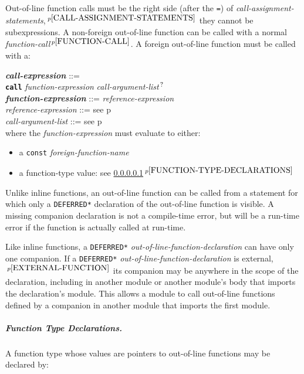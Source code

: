 \documentclass[12pt]{article}
\newcommand{\subsubsubsubsection}[1]{\subparagraph[#1]{#1.}}
\newcommand{\QMARK}{{$^{\,\mbox{\footnotesize ?}}$}}
\newcommand{\ttkey}[1]{{\tt \bfseries #1}}
\newcommand{\emkey}[1]{{\em \bfseries #1}}
\newcommand{\itemref}[1]{\ref{#1}$\,^{p\pageref{#1}}$}
\newcommand{\pagref}[1]{p\pageref{#1}}
\newcommand{\pagnote}[1]{$\,^{p\pageref{#1}}$}
\newenvironment{indpar}[1][0.3in]%
	{\begin{list}{}%
		     {\setlength{\itemsep}{0in}%
		      \setlength{\topsep}{0in}%
		      \setlength{\parsep}{1ex}%
		      \setlength{\labelwidth}{#1}%
		      \setlength{\leftmargin}{#1}%
		      \addtolength{\leftmargin}{\labelsep}}%
	 \item}%
	{\end{list}}
\begin{document}
Out-of-line function calls must be the right side (after the {\tt =})
of {\em call-assignment-state\-ments},\pagnote{CALL-ASSIGNMENT-STATEMENTS}
they cannot be subexpressions.
A non-foreign out-of-line function can be called with a normal
{\em function-call}\pagnote{FUNCTION-CALL}. A foreign
out-of-line function must be called with a:
\begin{indpar}
\emkey{call-expression}\label{CALL-EXPRESSION} ::= \\
\hspace*{0.25in}
	\ttkey{call} {\em function-expression}
	     {\em call-argument-list}\QMARK{}
\\[0.5ex]
\emkey{function-expression} ::= {\em reference-expression}
\\[0.5ex]
{\em reference-expression} ::= see \pagref{REFERENCE-EXPRESSION}
\\[0.5ex]
{\em call-argument-list} ::= see \pagref{CALL-ARGUMENT-LIST}
\\[2ex]
where the {\em function-expression} must evaluate to either:
\begin{itemize}
\item a {\tt const} {\em foreign-function-name}
\item a function-type value: see \itemref{FUNCTION-TYPE-DECLARATIONS}
\end{itemize}
\end{indpar}

Unlike inline functions, an out-of-line function can
be called from a statement for which only a {\tt *DEFERRED*} declaration
of the out-of-line function is visible.  A missing companion
declaration is not a compile-time error, but will be a
run-time error if the function is actually called at run-time.

Like inline functions, a {\tt *DEFERRED*} {\em out-of-line-function-declaration}
can have only one companion.
If\label{OUT-OF-LINE-EXTERNAL-COMPANION}
a {\tt *DEFERRED*} {\em out-of-line-function-declaration}
is external,\pagnote{EXTERNAL-FUNCTION}
its companion may be anywhere in the scope of the declaration,
including in another module or another module's body that imports
the declaration's module.
This allows a module to call out-of-line functions defined by
a companion in another module that imports the first module.

\subsubsubsubsection{Function Type Declarations}
\label{FUNCTION-TYPE-DECLARATIONS}

A function type whose values are pointers to out-of-line
functions may be declared by:
\end{document}
